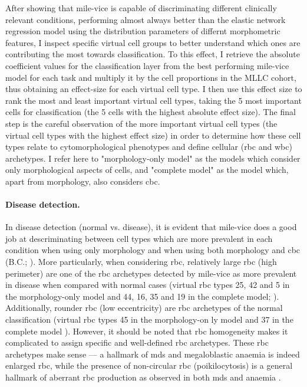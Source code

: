 After showing that \ac{mile-vice} is capable of discriminating different clinically relevant conditions, performing almost always better than the elastic network regression model using the distribution parameters of differnt morphometric features, I inspect specific virtual cell groups to better understand which ones are contributing the most towards classification. To this effect, I retrieve the absolute coefficient values for the classification layer from the best performing \ac{mile-vice} model for each task and multiply it by the cell proportions in the MLLC cohort, thus obtaining an effect-size for each virtual cell type. I then use this effect size to rank the most and least important virtual cell types, taking the 5 most important cells for classification (the 5 cells with the highest absolute effect size). The final step is the careful observation of the more important virtual cell types (the virtual cell types with the highest effect size) in order to determine how these cell types relate to cytomorphological phenotypes and define cellular (\ac{rbc} and \ac{wbc}) archetypes. I refer here to "morphology-only model" as the models which consider only morphological aspects of cells, and "complete model" as the model which, apart from morphology, also considers \ac{cbc}. 

\paragraph{Disease detection.} In disease detection (normal vs. disease), it is evident that \ac{mile-vice} does a good job at descriminating between cell types which are more prevalent in each condition when using only morphology and when using both morphology and \ac{cbc} (B.C.; ). More particularly, when considering \ac{rbc}, relatively large \ac{rbc} (high perimeter) are one of the \ac{rbc} archetypes detected by \ac{mile-vice} as more prevalent in disease when compared with normal cases (virtual \ac{rbc} types 25, 42 and 5 in the morphology-only model and 44, 16, 35 and 19 in the complete model; ). Additionally, rounder \ac{rbc} (low eccentricity) are \ac{rbc} archetypes of the normal classification (virtual \ac{rbc} types 45 in the morphology-on ly model and 37 in the complete model ). However, it should be noted that \ac{rbc} homogeneity makes it complicated to assign specific and well-defined \ac{rbc} archetypes. These \ac{rbc} archetypes make sense --- a hallmark of \ac{mds} and megaloblastic anaemia is indeed enlarged \ac{rbc}, while the presence of non-circular \ac{rbc} (poikilocytosis) is a general hallmark of aberrant \ac{rbc} production as observed in both \ac{mds} and anaemia \cite{Ford2013-nd}. 

